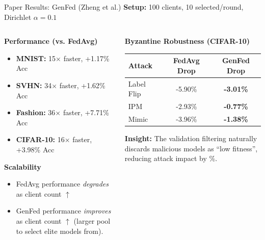 \documentclass{beamer}
\begin{document}
\begin{frame}{Paper Results: GenFed (Zheng et al.)}
\textbf{Setup:} 100 clients, 10 selected/round, Dirichlet $\alpha=0.1$

\begin{columns}[T]
\begin{column}{0.5\textwidth}
\textbf{Performance (vs. FedAvg)}
\begin{itemize}
    \item \textbf{MNIST:} 15$\times$ faster, +1.17\% Acc
    \item \textbf{SVHN:} 34$\times$ faster, +1.62\% Acc
    \item \textbf{Fashion:} 36$\times$ faster, +7.71\% Acc
    \item \textbf{CIFAR-10:} 16$\times$ faster, +3.98\% Acc
\end{itemize}
\vspace{1em}
\textbf{Scalability}
\begin{itemize}
    \item FedAvg performance \textit{degrades} as client count $\uparrow$
    \item GenFed performance \textit{improves} as client count $\uparrow$ (larger pool to select elite models from).
\end{itemize}
\end{column}

\begin{column}{0.5\textwidth}
\textbf{Byzantine Robustness (CIFAR-10)}
\begin{table}
\centering
\tiny
\begin{tabular}{lcc}
\toprule
\textbf{Attack} & \textbf{FedAvg Drop} & \textbf{GenFed Drop} \\
\midrule
Label Flip & -5.90\% & \textbf{-3.01\%} \\
IPM & -2.93\% & \textbf{-0.77\%} \\
Mimic & -3.96\% & \textbf{-1.38\%} \\
\bottomrule
\end{tabular}
\end{table}
\small \textbf{Insight:} The validation filtering naturally discards malicious models as ``low fitness'', reducing attack impact by \%.
\end{column}
\end{columns}
\end{frame}
\end{document}
